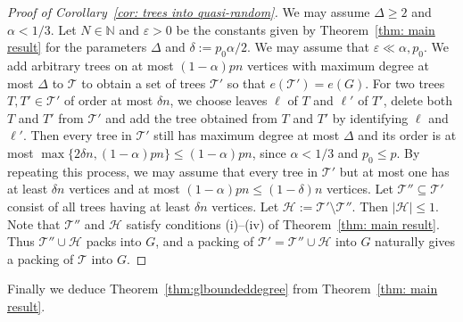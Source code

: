\documentclass[a4paper, 11pt, reqno]{amsart}
\numberwithin{equation}{section}
\newcommand{\1}{{\rm 1\hspace*{-0.4ex}%
\rule{0.1ex}{1.52ex}\hspace*{0.2ex}}}
\newcommand{\N}{\mathbb N}
\newcommand{\cT}{\mathcal{T}}
\newcommand{\cH}{\mathcal{H}}
\renewcommand{\epsilon}{\varepsilon}
\newcommand{\sm}{\setminus}
\newcommand{\sub}{\subseteq}
\newcommand{\COMMENT}[1]{}
\begin{document}
\begin{proof}[Proof of Corollary~\ref{cor: trees into quasi-random}]
We may assume $\Delta\geq 2$ and $\alpha < 1/3$. 
Let $N\in \N$ and $\epsilon>0$ be the constants given by Theorem~\ref{thm: main result} for the parameters $\Delta$ and $\delta:=p_0\alpha/2$.
We may assume that $\epsilon\ll \alpha,p_0$. 
We add arbitrary trees on at most $(1-\alpha)pn$ vertices with maximum degree at most $\Delta$ to $\cT$
to obtain a set of trees $\cT'$ so that $e(\cT') = e(G)$.
For two trees $T,T' \in \cT'$ of order at most $\delta n$, 
we choose leaves $\ell$ of $T$ and $\ell'$ of $T'$,
delete both $T$ and $T'$ from $\cT'$ and add the tree obtained from $T$ and $T'$ by identifying $\ell$ and $\ell'$. 
Then every tree in $\cT'$ still has maximum degree at most $\Delta$ and its order is at most $\max\{ 2\delta n, (1-\alpha)pn\} \leq (1-\alpha)pn$,
since $\alpha < 1/3$ and $p_0\leq p$. 
By repeating this process, 
we may assume that every tree in $\cT'$ but at most one has at least $\delta n$ vertices and at most $(1-\alpha)pn\leq (1-\delta)n$ vertices. 
Let $\cT''\sub \cT'$ consist of all trees having at least $\delta n$ vertices.
Let $\cH:=\cT'\sm \cT''$.
Then $|\cH|\leq 1$.\COMMENT{Since 
$$|\cT''| \geq \frac{e(G)-e(\cH)}{(1-\alpha)pn} 
\geq \frac{(p-\epsilon)\binom{n}{2}-\delta n}{(1-\alpha)pn} 
\geq \frac{(1-\alpha^2)p}{(1-\alpha)p}\cdot \frac{n}{2}
\geq \left(\frac{1}{2}+\delta\right) n,$$}
Note that $\cT''$ and $\cH$ satisfy conditions (i)--(iv) of Theorem~\ref{thm: main result}.
Thus $\cT''\cup \cH$ packs into $G$, 
and a packing of $\cT'=\cT''\cup \cH$ into $G$ naturally gives a packing of $\cT$ into $G$.
\end{proof}

Finally we deduce Theorem~\ref{thm:glboundeddegree} from Theorem~\ref{thm: main result}.
\end{document}
